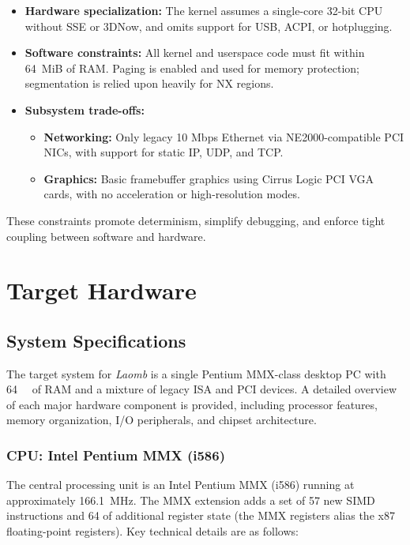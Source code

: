 \documentclass[12pt,a4paper]{report}
\begin{document}
	\begin{itemize}
		\item \textbf{Hardware specialization:} The kernel assumes a single-core 32-bit CPU without SSE or 3DNow, and omits support for USB, ACPI, or hotplugging.
		\item \textbf{Software constraints:} All kernel and userspace code must fit within 64~MiB of RAM. Paging is enabled and used for memory protection; segmentation is relied upon heavily for NX regions.
		\item \textbf{Subsystem trade-offs:}
		\begin{itemize}
			\item \textbf{Networking:} Only legacy 10 Mbps Ethernet via NE2000-compatible PCI NICs, with support for static IP, UDP, and TCP.
			\item \textbf{Graphics:} Basic framebuffer graphics using Cirrus Logic PCI VGA cards, with no acceleration or high-resolution modes.
		\end{itemize}
	\end{itemize}

	These constraints promote determinism, simplify debugging, and enforce tight coupling between software and hardware.

	
	\chapter{Target Hardware}
	\label{chap:target-hardware}
	
	\section{System Specifications}
	
	The target system for \emph{Laomb} is a single Pentium MMX-class desktop PC with \SI{64}{\mebi\byte} of RAM and a mixture of legacy ISA and PCI devices. A detailed overview of each major hardware component is provided, including processor features, memory organization, I/O peripherals, and chipset architecture.
	
	\subsection{CPU: Intel Pentium MMX (i586)}
	\label{sec:cpu}
	
	The central processing unit is an Intel Pentium MMX (i586) running at approximately \SI{166.1}{\mega\hertz}. The MMX extension adds a set of 57 new SIMD instructions and \SI{64}{\bit} of additional register state (the MMX registers alias the x87 floating-point registers). Key technical details are as follows:
	
\end{document}

